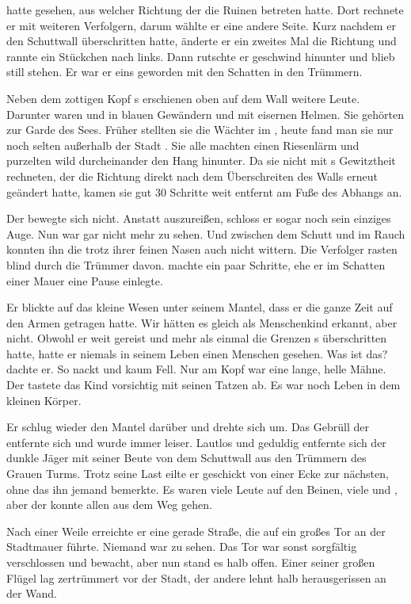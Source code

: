 \begin{Large}
{\Eno} hatte gesehen, aus welcher Richtung der {\Bangiri} die Ruinen betreten hatte. Dort rechnete er mit weiteren Verfolgern, darum wählte er eine andere Seite. Kurz nachdem er den Schuttwall überschritten hatte, änderte er ein zweites Mal die Richtung und rannte ein Stückchen nach links. Dann rutschte er geschwind hinunter und blieb still stehen. Er war er eins geworden mit den Schatten in den Trümmern.

Neben dem zottigen Kopf {\Pato}s erschienen oben auf dem Wall weitere Leute. Darunter waren {\Bangiri} und {\Enlander} in blauen Gewändern und mit eisernen Helmen. Sie gehörten zur Garde des Sees. Früher stellten sie die Wächter im {\Enland}, heute fand man sie nur noch selten außerhalb der Stadt {\Tern}. Sie alle machten einen Riesenlärm und purzelten wild durcheinander den Hang hinunter. Da sie nicht mit {\Eno}s Gewitztheit rechneten, der die Richtung direkt nach dem Überschreiten des Walls erneut geändert hatte, kamen sie gut 30 Schritte weit entfernt am Fuße des Abhangs an.

Der {\Schattenlaufer} bewegte sich nicht. Anstatt auszureißen, schloss er sogar noch sein einziges Auge. Nun war gar nicht mehr zu sehen. Und zwischen dem Schutt und im Rauch konnten ihn die {\Bangiri} trotz ihrer feinen Nasen auch nicht wittern. Die Verfolger rasten blind durch die Trümmer davon. {\Eno} machte ein paar Schritte, ehe er im Schatten einer Mauer eine Pause einlegte. 

Er blickte auf das kleine Wesen unter seinem Mantel, dass er die ganze Zeit auf den Armen getragen hatte. Wir hätten es gleich als Menschenkind erkannt, aber {\Eno} nicht. Obwohl er weit gereist und mehr als einmal die Grenzen {\Rhingell}s überschritten hatte, hatte er niemals in seinem Leben einen Menschen gesehen. Was ist das? dachte er. So nackt und kaum Fell. Nur am Kopf war eine lange, helle Mähne. Der {\Schattenlaufer} tastete das Kind vorsichtig mit seinen Tatzen ab. Es war noch Leben in dem kleinen Körper. 

Er schlug wieder den Mantel darüber und drehte sich um. Das Gebrüll der {\Bangiri} entfernte sich und wurde immer leiser. Lautlos und geduldig entfernte sich der dunkle Jäger mit seiner Beute von dem Schuttwall aus den Trümmern des Grauen Turms. Trotz seine Last eilte er geschickt von einer Ecke zur nächsten, ohne das ihn jemand bemerkte. Es waren viele Leute auf den Beinen, viele {\Enlander} und {\Bangiri}, aber der {\Schattenlaufer} konnte allen aus dem Weg gehen.

Nach einer Weile erreichte er eine gerade Straße, die auf ein großes Tor an der Stadtmauer führte. Niemand war zu sehen. Das Tor war sonst sorgfältig verschlossen und bewacht, aber nun stand es halb offen. Einer seiner großen Flügel lag zertrümmert vor der Stadt, der andere lehnt halb herausgerissen an der Wand. 


\end{Large}
